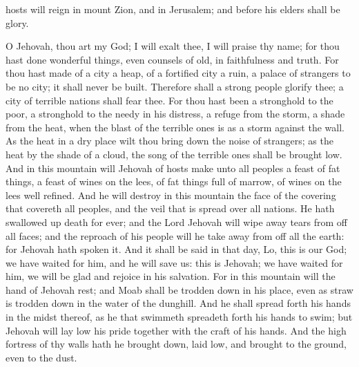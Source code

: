 hosts will reign in mount Zion, and in Jerusalem; and before his elders shall be glory. 

O Jehovah, thou art my God; I will exalt thee, I will praise thy name; for thou hast done wonderful things, even counsels of old, in faithfulness and truth. For thou hast made of a city a heap, of a fortified city a ruin, a palace of strangers to be no city; it shall never be built. Therefore shall a strong people glorify thee; a city of terrible nations shall fear thee. For thou hast been a stronghold to the poor, a stronghold to the needy in his distress, a refuge from the storm, a shade from the heat, when the blast of the terrible ones is as a storm against the wall. As the heat in a dry place wilt thou bring down the noise of strangers; as the heat by the shade of a cloud, the song of the terrible ones shall be brought low.  And in this mountain will Jehovah of hosts make unto all peoples a feast of fat things, a feast of wines on the lees, of fat things full of marrow, of wines on the lees well refined. And he will destroy in this mountain the face of the covering that covereth all peoples, and the veil that is spread over all nations. He hath swallowed up death for ever; and the Lord Jehovah will wipe away tears from off all faces; and the reproach of his people will he take away from off all the earth: for Jehovah hath spoken it.  And it shall be said in that day, Lo, this is our God; we have waited for him, and he will save us: this is Jehovah; we have waited for him, we will be glad and rejoice in his salvation. For in this mountain will the hand of Jehovah rest; and Moab shall be trodden down in his place, even as straw is trodden down in the water of the dunghill. And he shall spread forth his hands in the midst thereof, as he that swimmeth spreadeth forth his hands to swim; but Jehovah will lay low his pride together with the craft of his hands. And the high fortress of thy walls hath he brought down, laid low, and brought to the ground, even to the dust. 

